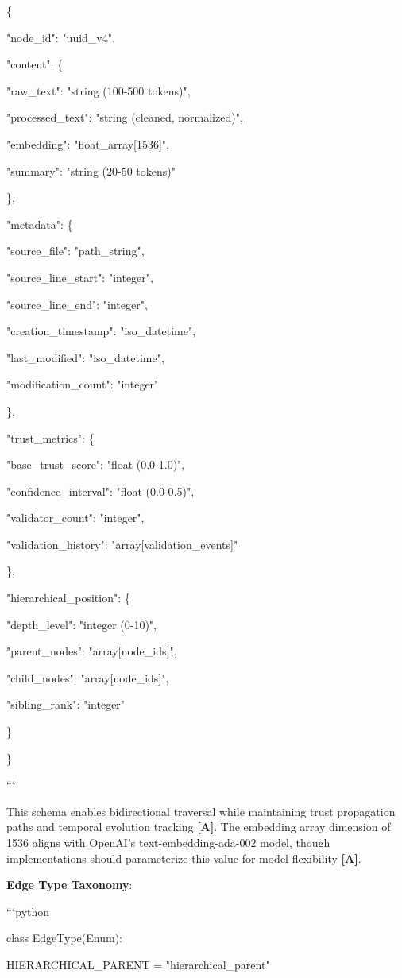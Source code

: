 \documentclass[a4paper,11pt]{article}
\newcommand{\alabel}{\textbf{\textcolor{acolor}{[A]}}}
\begin{document}
\{

"node\_id": "uuid\_v4",

"content": \{

"raw\_text": "string (100-500 tokens)",

"processed\_text": "string (cleaned, normalized)",

"embedding": "float\_array[1536]",

"summary": "string (20-50 tokens)"

\},

"metadata": \{

"source\_file": "path\_string",

"source\_line\_start": "integer",

"source\_line\_end": "integer",

"creation\_timestamp": "iso\_datetime",

"last\_modified": "iso\_datetime",

"modification\_count": "integer"

\},

"trust\_metrics": \{

"base\_trust\_score": "float (0.0-1.0)",

"confidence\_interval": "float (0.0-0.5)",

"validator\_count": "integer",

"validation\_history": "array[validation\_events]"

\},

"hierarchical\_position": \{

"depth\_level": "integer (0-10)",

"parent\_nodes": "array[node\_ids]",

"child\_nodes": "array[node\_ids]",

"sibling\_rank": "integer"

\}

\}

```


This schema enables bidirectional traversal while maintaining trust propagation paths and temporal evolution tracking \alabel{}. The embedding array dimension of 1536 aligns with OpenAI's text-embedding-ada-002 model, though implementations should parameterize this value for model flexibility \alabel{}.


\textbf{Edge Type Taxonomy}:

```python

class EdgeType(Enum):

HIERARCHICAL\_PARENT = "hierarchical\_parent"
\end{document}

